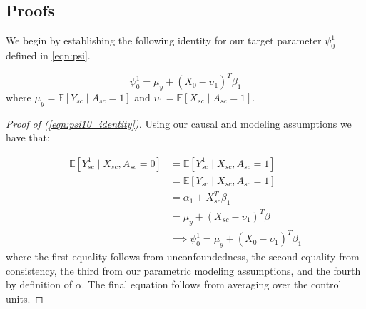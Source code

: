 \subsection{Proofs}\label{app:AsecIII}

We begin by establishing the following identity for our target parameter $\psi_0^1$ defined in \eqref{eqn:psi}.

\begin{equation}\label{eqn:psi10_identity}
\psi^1_0 = \mu_y + (\bar{X}_0 - \upsilon_1)^T\beta_1
\end{equation}
%
where $\mu_y = \mathbb{E}[Y_{sc} \mid A_{sc} = 1]$ and $\upsilon_1 = \mathbb{E}[X_{sc} \mid A_{sc} = 1]$.

\begin{proof}[Proof of (\ref{eqn:psi10_identity})]
Using our causal and modeling assumptions we have that:

\begin{align*}
\mathbb{E}[Y_{sc}^1 \mid X_{sc}, A_{sc} = 0] &= \mathbb{E}[Y_{sc}^1 \mid X_{sc}, A_{sc} = 1] \\
&= \mathbb{E}[Y_{sc} \mid X_{sc}, A_{sc} = 1] \\
&= \alpha_1 + X_{sc}^T\beta_1 \\
&= \mu_y + (X_{sc} - \upsilon_1)^T\beta \\
&\implies \psi_0^1 = \mu_y + (\bar{X}_0 - \upsilon_1)^T\beta_1
\end{align*}
%
where the first equality follows from unconfoundedness, the second equality from consistency, the third from our parametric modeling assumptions, and the fourth by definition of $\alpha$. The final equation follows from averaging over the control units.
\end{proof}
%

